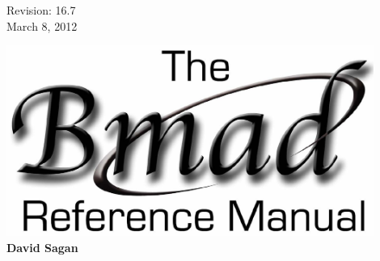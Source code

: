 \thispagestyle{empty}

\begin{flushright}
\large
  Revision: 16.7 \\
  March 8, 2012 \\
\end{flushright}

\vfill

{
\begin{center}
\includegraphics[width=12cm]{bmad-ref-manual.pdf} \\
\vskip 0.3in
\huge\bf David Sagan
\end{center}
}

\vfill
\break

